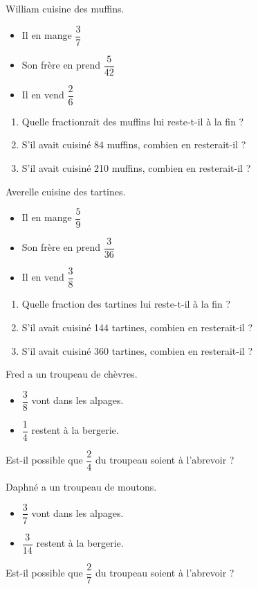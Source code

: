 \begin{minipage}[t]{0.45\textwidth}

William cuisine des muffins. 
\begin{itemize}
    \item Il en mange $\dfrac{3}{7}$
    \item Son frère en prend $\dfrac{5}{42}$
    \item Il en vend $\dfrac{2}{6}$
\end{itemize}
\begin{enumerate}
    \item Quelle fractionrait des muffins lui reste-t-il à la fin ?
    \item S'il avait cuisiné 84 muffins, combien en resterait-il ?
    \item S'il avait cuisiné 210 muffins, combien en resterait-il ?
\end{enumerate}
\end{minipage}
\hfil
\vrule
\hfil
\begin{minipage}[t]{0.45\textwidth}

Averelle cuisine des tartines. 
\begin{itemize}
    \item Il en mange $\dfrac{5}{9}$
    \item Son frère en prend $\dfrac{3}{36}$
    \item Il en vend $\dfrac{3}{8}$
\end{itemize}
\begin{enumerate}
    \item Quelle fraction des tartines lui reste-t-il à la fin ?
    \item S'il avait cuisiné 144 tartines, combien en resterait-il ?
    \item S'il avait cuisiné 360 tartines, combien en resterait-il ?
\end{enumerate}
\end{minipage}


\begin{minipage}[t]{0.45\textwidth}

Fred a un troupeau de chèvres. 
\begin{itemize}
    \item $\dfrac{3}{8}$ vont dans les alpages.
    \item $\dfrac{1}{4}$ restent à la bergerie.
\end{itemize}
Est-il possible que $ \dfrac{2}{4}$ du troupeau soient à l'abrevoir ?
\end{minipage}
\hfil
\vrule
\hfil
\begin{minipage}[t]{0.45\textwidth}

Daphné a un troupeau de moutons. 
\begin{itemize}
    \item $\dfrac{3}{7}$ vont dans les alpages.
    \item $\dfrac{3}{14}$ restent à la bergerie.
\end{itemize}
Est-il possible que $ \dfrac{2}{7}$ du troupeau soient à l'abrevoir ?
\end{minipage}

